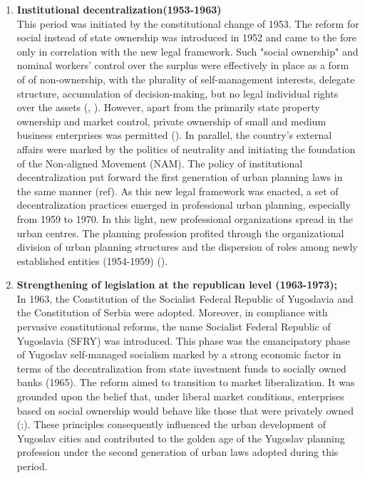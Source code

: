 \documentclass[11pt]{report}
\begin{document}
\begin{enumerate}
\item  \textbf{Institutional decentralization(1953-1963)}
\\
This period was initiated by the constitutional change of 1953. The reform for social instead of state ownership was introduced in 1952 and came to the fore only in correlation with the new legal framework. Such "social ownership" and nominal workers’ control over the surplus were effectively in place as a form of  of non-ownership, with the plurality of self-management interests, delegate structure, accumulation of decision-making, but no legal individual rights over the assets (\href{Estrin}{\citealt{estrin_yugoslavia:_1991}}, \href{Zec}{\citealt{zec_economic_2012}}).
However, apart from the primarily state property ownership and market control, private ownership of small and medium business enterprises was permitted (\href{Hadzic}{\citealt{hadzic_yugoslav_2002}}).
In parallel, the country’s external affairs were marked by the politics of neutrality and initiating the foundation of the Non-aligned Movement (NAM). The policy of institutional decentralization put forward the first generation of urban planning laws in the same manner (ref). As this new legal framework was enacted, a set of decentralization practices emerged in professional urban planning, especially from 1959 to 1970. In this light, new professional organizations spread in the urban centres. The planning profession profited through the organizational division of urban planning structures and the dispersion of roles among newly established entities (1954-1959) (\href{Nedovic}{\citealt{nedovic-budic_mornings_2011}}). 

\item  \textbf{Strengthening of legislation at the republican level  (1963-1973);}
\\
In 1963, the Constitution of the Socialist Federal Republic of Yugoslavia and the Constitution of Serbia were adopted. Moreover, in compliance with pervasive constitutional reforms, the name Socialist Federal Republic of Yugoslavia (SFRY) was introduced. This phase was the emancipatory phase of Yugoslav self-managed socialism marked by a strong economic factor in terms of the decentralization from state investment funds to socially owned banks (1965). The reform aimed to transition to market liberalization. It was grounded upon the belief that, under liberal market conditions, enterprises based on social ownership would behave like those that were privately owned  (\href{Estrin}{\citealt{estrin_self_1983}};\href{Zec}{\citealt{zec_economic_2012}}).
These principles consequently influenced the urban development of Yugoslav cities and contributed to the golden age of the Yugoslav planning profession under the second generation of urban laws adopted during this period.
\\


\end{enumerate}
\end{document}
